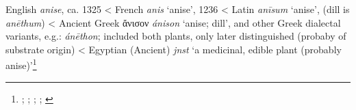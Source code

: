 \begin{etymology}\label{ety:anise}
English \textit{anise}, ca. 1325
< French \textit{anis} `anise', 1236
< Latin \textit{anīsum} `anise', (dill is \textit{anēthum})
< Ancient Greek {ἄνισον} \textit{ánison} `anise; dill', and other Greek dialectal variants, e.g.: \textit{ánēthon}; included both plants, only later distinguished (probaby of substrate origin)
< Egyptian (Ancient) \textit{jnst} `a medicinal, edible plant (probably anise)'\footnote{\textcites[anise]{oed}[anise]{ahd}; \textcite[s.v. anis]{tlfi}; \textcite{lewis_latin_1879}; \textcite{liddell_greek-english_1940}; \textcites[99]{erman_worterbuch_1926}[240]{hemmerdinger_noms_1968}}
\end{etymology}